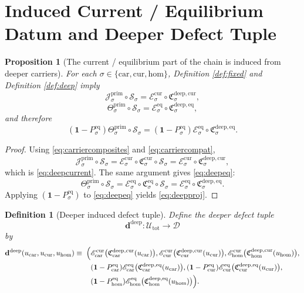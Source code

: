 \documentclass[11pt]{article}
\newcommand{\Car}{\mathrm{car}}
\newcommand{\Cur}{\mathrm{cur}}
\newcommand{\Hom}{\mathrm{hom}}
\newcommand{\CurrentCarrier}[1]{\mathfrak C_{#1}^{\mathrm{cur}}}
\newcommand{\EqCarrier}[1]{\mathfrak C_{#1}^{\mathrm{eq}}}
\newcommand{\CurrentExtract}[1]{\mathscr E_{#1}^{\mathrm{cur}}}
\newcommand{\EqExtract}[1]{\mathscr E_{#1}^{\mathrm{eq}}}
\newcommand{\PrimCurrent}[1]{\mathcal J_{#1}^{\mathrm{prim}}}
\newcommand{\PrimTheta}[1]{\Theta_{#1}^{\mathrm{prim}}}
\newcommand{\EqProj}[1]{P_{#1}^{\mathrm{eq}}}
\newcommand{\DefectSpace}{\mathcal D}
\newcommand{\DeepDefectTuple}{\mathbf d^{\mathrm{deep}}}
\newcommand{\DeepShell}{\mathcal U_{\mathrm{tot}}}
\newcommand{\DeepCurrentCarrier}[1]{\mathfrak C_{#1}^{\mathrm{deep,cur}}}
\newcommand{\DeepEqCarrier}[1]{\mathfrak C_{#1}^{\mathrm{deep,eq}}}
\newcommand{\ChainSelect}[1]{\mathcal S_{#1}}
\newtheorem{definition}{Definition}
\newtheorem{proposition}{Proposition}
\begin{document}
\section{Induced Current / Equilibrium Datum and Deeper Defect Tuple}

\begin{proposition}[The current / equilibrium part of the chain is induced from deeper carriers]
\label{prop:currenteq}
For each \(\sigma\in\{\Car,\Cur,\Hom\}\), Definition \ref{def:fixed} and Definition \ref{def:deep} imply
\begin{equation}
\PrimCurrent{\sigma}\circ\ChainSelect{\sigma}
=
\CurrentExtract{\sigma}\circ\DeepCurrentCarrier{\sigma},
\label{eq:deepcurrent}
\end{equation}
\begin{equation}
\PrimTheta{\sigma}\circ\ChainSelect{\sigma}
=
\EqExtract{\sigma}\circ\DeepEqCarrier{\sigma},
\label{eq:deepeq}
\end{equation}
and therefore
\begin{equation}
(\mathbf 1-\EqProj{\sigma})\PrimTheta{\sigma}\circ\ChainSelect{\sigma}
=
(\mathbf 1-\EqProj{\sigma})\EqExtract{\sigma}\circ\DeepEqCarrier{\sigma}.
\label{eq:deepproj}
\end{equation}
\end{proposition}

\begin{proof}
Using \eqref{eq:carriercomposites} and \eqref{eq:carriercompat},
\[
\PrimCurrent{\sigma}\circ\ChainSelect{\sigma}
=
\CurrentExtract{\sigma}\circ\CurrentCarrier{\sigma}\circ\ChainSelect{\sigma}
=
\CurrentExtract{\sigma}\circ\DeepCurrentCarrier{\sigma},
\]
which is \eqref{eq:deepcurrent}. The same argument gives \eqref{eq:deepeq}:
\[
\PrimTheta{\sigma}\circ\ChainSelect{\sigma}
=
\EqExtract{\sigma}\circ\EqCarrier{\sigma}\circ\ChainSelect{\sigma}
=
\EqExtract{\sigma}\circ\DeepEqCarrier{\sigma}.
\]
Applying \((\mathbf 1-\EqProj{\sigma})\) to \eqref{eq:deepeq} yields \eqref{eq:deepproj}.
\end{proof}

\begin{definition}[Deeper induced defect tuple]
\label{def:deepdefect}
Define the deeper defect tuple
\[
\DeepDefectTuple:\DeepShell\to\DefectSpace
\]
by
\begin{equation}
\begin{aligned}
\DeepDefectTuple(u_{\Car},u_{\Cur},u_{\Hom})
\equiv\;
\Bigl(
&\CurrentExtract{\Car}\bigl(\DeepCurrentCarrier{\Car}(u_{\Car})\bigr),
\CurrentExtract{\Cur}\bigl(\DeepCurrentCarrier{\Cur}(u_{\Cur})\bigr),
\CurrentExtract{\Hom}\bigl(\DeepCurrentCarrier{\Hom}(u_{\Hom})\bigr),
\\
&(\mathbf 1-\EqProj{\Car})\EqExtract{\Car}\bigl(\DeepEqCarrier{\Car}(u_{\Car})\bigr),
(\mathbf 1-\EqProj{\Cur})\EqExtract{\Cur}\bigl(\DeepEqCarrier{\Cur}(u_{\Cur})\bigr),
\\
&
(\mathbf 1-\EqProj{\Hom})\EqExtract{\Hom}\bigl(\DeepEqCarrier{\Hom}(u_{\Hom})\bigr)
\Bigr).
\end{aligned}
\label{eq:deepdef}
\end{equation}
\end{definition}
\end{document}
